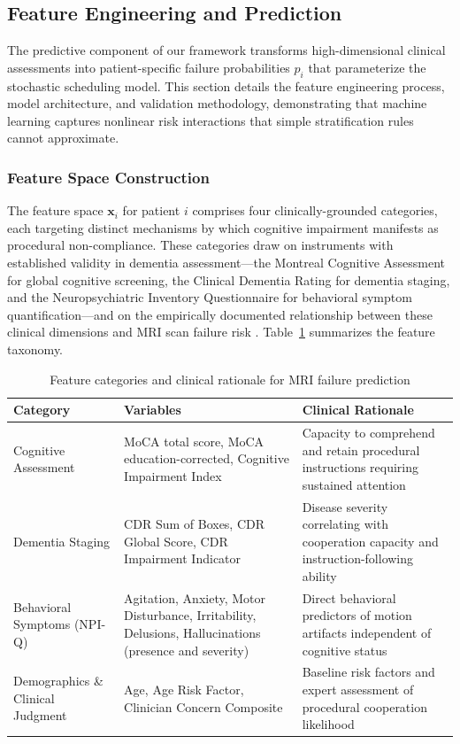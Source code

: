 \documentclass[11pt,a4paper]{article}
\begin{document}
\subsection{Feature Engineering and Prediction}
\label{sec:predictive_model}

The predictive component of our framework transforms high-dimensional clinical assessments into patient-specific failure probabilities $p_i$ that parameterize the stochastic scheduling model. This section details the feature engineering process, model architecture, and validation methodology, demonstrating that machine learning captures nonlinear risk interactions that simple stratification rules cannot approximate.

\subsubsection{Feature Space Construction}

The feature space $\mathbf{x}_i$ for patient $i$ comprises four clinically-grounded categories, each targeting distinct mechanisms by which cognitive impairment manifests as procedural non-compliance. These categories draw on instruments with established validity in dementia assessment---the Montreal Cognitive Assessment \citep{nasreddine2005montreal} for global cognitive screening, the Clinical Dementia Rating \citep{morris1993clinical} for dementia staging, and the Neuropsychiatric Inventory Questionnaire \citep{kaufer2000validation,cummings1994neuropsychiatric} for behavioral symptom quantification---and on the empirically documented relationship between these clinical dimensions and MRI scan failure risk \citep{porembka2025disparities}. Table~\ref{tab:feature_categories} summarizes the feature taxonomy.

\begin{table}[htbp]
\centering
\caption{Feature categories and clinical rationale for MRI failure prediction}
\label{tab:feature_categories}
\begin{tabular}{@{}p{3.5cm}p{4cm}p{5.5cm}@{}}
\toprule
\textbf{Category} & \textbf{Variables} & \textbf{Clinical Rationale} \\
\midrule
Cognitive Assessment & MoCA total score, MoCA education-corrected, Cognitive Impairment Index & Capacity to comprehend and retain procedural instructions requiring sustained attention \\
\addlinespace
Dementia Staging & CDR Sum of Boxes, CDR Global Score, CDR Impairment Indicator & Disease severity correlating with cooperation capacity and instruction-following ability \\
\addlinespace
Behavioral Symptoms (NPI-Q) & Agitation, Anxiety, Motor Disturbance, Irritability, Delusions, Hallucinations (presence and severity) & Direct behavioral predictors of motion artifacts independent of cognitive status \\
\addlinespace
Demographics \& Clinical Judgment & Age, Age Risk Factor, Clinician Concern Composite & Baseline risk factors and expert assessment of procedural cooperation likelihood \\
\bottomrule
\end{tabular}
\end{table}
\end{document}
